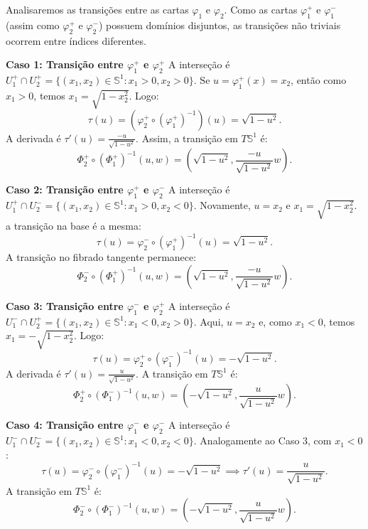 {	Analisaremos as transições entre as cartas $\varphi_1$ e $\varphi_2$. Como as cartas $\varphi_1^+$ e $\varphi_1^-$ (assim como $\varphi_2^+$ e $\varphi_2^-$) possuem domínios disjuntos, as transições não triviais ocorrem entre índices diferentes.
	
	\textbf{Caso 1: Transição entre $\varphi_1^+$ e $\varphi_2^+$}
	A interseção é $U_1^+ \cap U_2^+ = \{ (x_1, x_2) \in \mathbb{S}^1 : x_1 > 0, x_2 > 0 \}$.
	Se $u = \varphi_1^+(x) = x_2$, então como $x_1 > 0$, temos $x_1 = \sqrt{1 - x_2^2}$. Logo:
	\begin{equation*}
		\tau(u) = (\varphi_2^+ \circ (\varphi_1^+)^{-1})(u) = \sqrt{1 - u^2}.
	\end{equation*}
	A derivada é $\tau'(u) = \frac{-u}{\sqrt{1-u^2}}$. Assim, a transição em $T\mathbb{S}^1$ é:
	\begin{equation*}
		\Phi_2^+ \circ (\Phi_1^+)^{-1}(u, w) = \left( \sqrt{1-u^2}, \frac{-u}{\sqrt{1-u^2}}w \right).
	\end{equation*}
	
	\textbf{Caso 2: Transição entre $\varphi_1^+$ e $\varphi_2^-$}
	A interseção é $U_1^+ \cap U_2^- = \{ (x_1, x_2) \in \mathbb{S}^1 : x_1 > 0, x_2 < 0 \}$.
	Novamente, $u = x_2$ e $x_1 = \sqrt{1-x_2^2}$. a transição na base é a mesma:
	\begin{equation*}
		\tau(u) = \varphi_2^- \circ (\varphi_1^+)^{-1}(u) = \sqrt{1 - u^2}.
	\end{equation*}
	A transição no fibrado tangente permanece:
	\begin{equation*}
		\Phi_2^- \circ (\Phi_1^+)^{-1}(u, w) = \left( \sqrt{1-u^2}, \frac{-u}{\sqrt{1-u^2}}w \right).
	\end{equation*}
	
	\textbf{Caso 3: Transição entre $\varphi_1^-$ e $\varphi_2^+$}
	A interseção é $U_1^- \cap U_2^+ = \{ (x_1, x_2) \in \mathbb{S}^1 : x_1 < 0, x_2 > 0 \}$.
	Aqui, $u = x_2$ e, como $x_1 < 0$, temos $x_1 = -\sqrt{1 - x_2^2}$. Logo:
	\begin{equation*}
		\tau(u) = \varphi_2^+ \circ (\varphi_1^-)^{-1}(u) = -\sqrt{1 - u^2}.
	\end{equation*}
	A derivada é $\tau'(u) = \frac{u}{\sqrt{1-u^2}}$. A transição em $T\mathbb{S}^1$ é:
	\begin{equation*}
		\Phi_2^+ \circ (\Phi_1^-)^{-1}(u, w) = \left( -\sqrt{1-u^2}, \frac{u}{\sqrt{1-u^2}}w \right).
	\end{equation*}
	
	\textbf{Caso 4: Transição entre $\varphi_1^-$ e $\varphi_2^-$}
	A interseção é $U_1^- \cap U_2^- = \{ (x_1, x_2) \in \mathbb{S}^1 : x_1 < 0, x_2 < 0 \}$.
	Analogamente ao Caso 3, com $x_1 < 0$:
	\begin{equation*}
		\tau(u) = \varphi_2^- \circ (\varphi_1^-)^{-1}(u) = -\sqrt{1 - u^2} \implies \tau'(u) = \frac{u}{\sqrt{1-u^2}}.
	\end{equation*}
	A transição em $T\mathbb{S}^1$ é:
	\begin{equation*}
		\Phi_2^- \circ (\Phi_1^-)^{-1}(u, w) = \left( -\sqrt{1-u^2}, \frac{u}{\sqrt{1-u^2}}w \right).
	\end{equation*}
	
}
